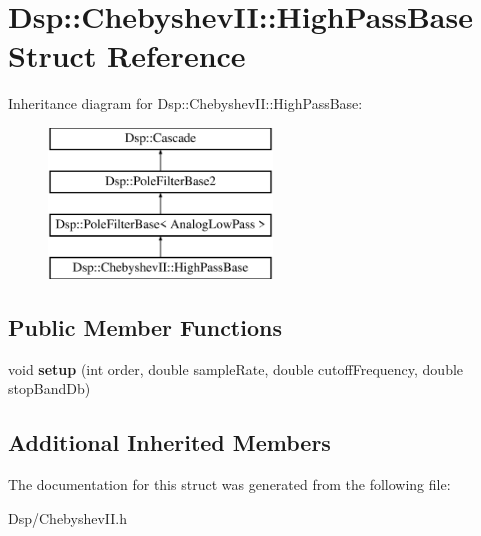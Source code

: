 \hypertarget{structDsp_1_1ChebyshevII_1_1HighPassBase}{\section{Dsp\-:\-:Chebyshev\-I\-I\-:\-:High\-Pass\-Base Struct Reference}
\label{structDsp_1_1ChebyshevII_1_1HighPassBase}
}
Inheritance diagram for Dsp\-:\-:Chebyshev\-I\-I\-:\-:High\-Pass\-Base\-:\begin{figure}[H]
\begin{center}
\leavevmode
\includegraphics[height=4.000000cm]{structDsp_1_1ChebyshevII_1_1HighPassBase}
\end{center}
\end{figure}
\subsection*{Public Member Functions}
\begin{DoxyCompactItemize}
\item 
\hypertarget{structDsp_1_1ChebyshevII_1_1HighPassBase_a59046572c1474322ee603075d0842d81}{void {\bfseries setup} (int order, double sample\-Rate, double cutoff\-Frequency, double stop\-Band\-Db)}\label{structDsp_1_1ChebyshevII_1_1HighPassBase_a59046572c1474322ee603075d0842d81}

\end{DoxyCompactItemize}
\subsection*{Additional Inherited Members}


The documentation for this struct was generated from the following file\-:\begin{DoxyCompactItemize}
\item 
Dsp/Chebyshev\-I\-I.\-h\end{DoxyCompactItemize}
